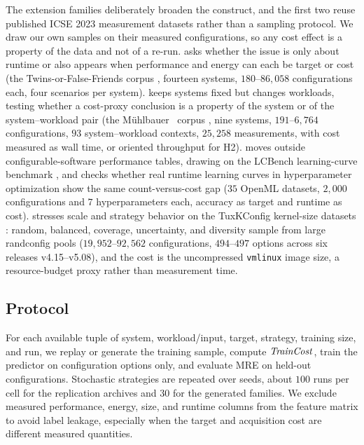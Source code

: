 The extension families deliberately broaden the construct, and the first two
reuse published ICSE 2023 measurement datasets rather than a sampling protocol.
We draw our own samples on their measured configurations, so any cost effect is a
property of the data and not of a re-run. \StudyEnergy asks whether the issue is
only about runtime or also appears when performance and energy can each be target
or cost (the Twins-or-False-Friends corpus \cite{weber2023twins}, fourteen systems,
$180$--$86{,}058$ configurations each, four scenarios per system). \StudyWorkload
keeps systems fixed but changes workloads, testing whether a cost-proxy conclusion
is a property of the system or of the system--workload pair (the M\"uhlbauer
\etal\ corpus \cite{muhlbauer2023workload}, nine systems, $191$--$6{,}764$
configurations, $93$ system--workload contexts, $25{,}258$ measurements, with cost
measured as wall time, or oriented throughput for H2). \StudyLCBench moves outside
configurable-software performance tables, drawing on the LCBench learning-curve
benchmark \cite{zimmer2021autopytorch}, and checks whether real runtime learning
curves in hyperparameter optimization show the same count-versus-cost gap ($35$
OpenML datasets, $2{,}000$ configurations and $7$ hyperparameters each, accuracy
as target and runtime as cost). \StudyLinux stresses scale and strategy behavior
on the TuxKConfig kernel-size datasets \cite{martin2022linux,borges2025linux}:
random, balanced, coverage, uncertainty, and diversity sample from large
randconfig pools ($19{,}952$--$92{,}562$ configurations, $494$--$497$ options
across six releases v4.15--v5.08), and the cost is the uncompressed
\texttt{vmlinux} image size, a resource-budget proxy rather than measurement time.
\subsection{Protocol}
\label{subsec:protocol}

For each available tuple of system, workload/input, target, strategy, training
size, and run, we replay or generate the training sample, compute
$\mathit{TrainCost}$, train the predictor on configuration options only, and evaluate
MRE on held-out configurations. Stochastic strategies are repeated over
seeds, about $100$ runs per cell for the replication archives and $30$ for the
generated families. We exclude measured performance, energy, size, and runtime
columns from the feature matrix to avoid label leakage, especially when the
target and acquisition cost are different measured quantities.

